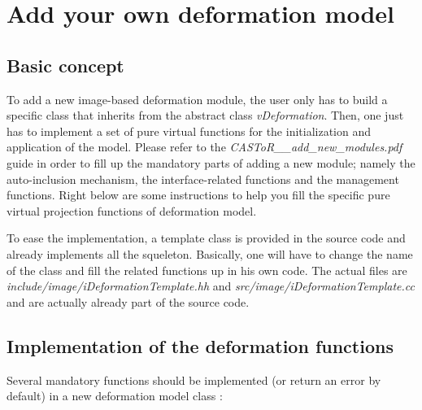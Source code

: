 \documentclass[a4paper, 11pt]{article}
\begin{document}
\section{Add your own deformation model}
\label{s_Add your own deformation model}

\subsection{Basic concept}

To add a new image-based deformation module, the user only has to build a specific class that inherits from the abstract class \textit{vDeformation}. Then, one just has to implement a set of pure virtual functions for the initialization and application of the model. Please refer to the \textit{CASToR\_\_add\_new\_modules.pdf} guide in order to fill up the mandatory parts of adding a new module; namely the auto-inclusion mechanism, the interface-related functions and the management functions. Right below are some instructions to help you fill the specific pure virtual projection functions of deformation model.

\bigskip
To ease the implementation, a template class is provided in the source code and already implements all the squeleton. Basically, one will have to change the name of the class and fill the related functions up in his own code. The actual files are \textit{include/image/iDeformationTemplate.hh} and \textit{src/image/iDeformationTemplate.cc} and are actually already part of the source code.

\subsection{Implementation of the deformation functions}

Several mandatory functions should be implemented (or return an error by default) in a new deformation model class :
\end{document}
